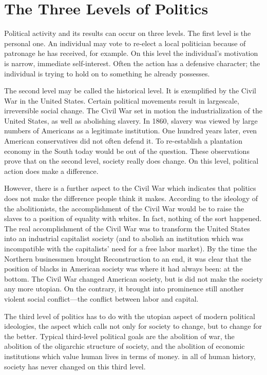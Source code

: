 \chapter{The Three Levels of Politics}


Political activity and its results can occur on three levels. The first level 
is the personal one. An individual may vote to re-elect a local politician 
because of patronage he has received, for example. On this level the 
individual's motivation is narrow, immediate self-interest. Often the action 
has a defensive character; the individual is trying to hold on to something he 
already possesses. 

The second level may be called the historical level. It is exemplified by 
the Civil War in the United States. Certain political movements result in 
largescale, irreversible social change. The Civil War set in motion the 
industrialization of the United States, as well as abolishing slavery. In 1860, 
slavery was viewed by large numbers of Americans as a legitimate institution. 
One hundred years later, even American conservatives did not often defend 
it. To re-establish a plantation economy in the South today would be out of 
the question. These observations prove that on the second level, society 
really does change. On this level, political action does make a difference. 

However, there is a further aspect to the Civil War which indicates that 
politics does not make the difference people think it makes. According to 
the ideology of the abolitionists, the accomplishment of the Civil War would 
be to raise the slaves to a position of equality with whites. In fact, nothing of 
the sort happened. The real accomplishment of the Civil War was to 
transform the United States into an industrial capitalist society (and to 
abolish an institution which was incompatible with the capitalists' need for a 
free labor market). By the time the Northern businessmen brought 
Reconstruction to an end, it was clear that the position of blacks in 
American society was where it had always been: at the bottom. The Civil 
War changed American society, but is did not make the society any more 
utopian. On the contrary, it brought into prominence still another violent 
social conflict---the conflict between labor and capital. 

The third level of politics has to do with the utopian aspect of modern 
political ideologies, the aspect which calls not only for society to change, but 
to change for the better. Typical third-level political goals are the abolition 
of war, the abolition of the oligarchic structure of society, and the abolition 
of economic institutions which value human lives in terms of money. in all 
of human history, society has never changed on this third level. 

